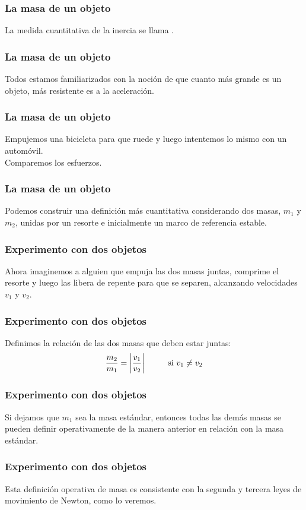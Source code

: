 \documentclass[12pt]{beamer}
\begin{document}
\begin{frame}
\frametitle{La masa de un objeto}
La medida cuantitativa de la inercia se llama .
\end{frame}
\begin{frame}
\frametitle{La masa de un objeto}
Todos estamos familiarizados con la noción de que cuanto más grande es un objeto, más resistente es a la aceleración.
\end{frame}
\begin{frame}
\frametitle{La masa de un objeto}
Empujemos una bicicleta para que ruede y luego intentemos lo mismo con un automóvil.
\\
\bigskip
\pause
Comparemos los esfuerzos.
\end{frame}
\begin{frame}
\frametitle{La masa de un objeto}
Podemos construir una definición más cuantitativa considerando dos masas, $m_{1}$ y $m_{2}$, unidas por un resorte e inicialmente un marco de referencia estable.
\end{frame}
\begin{frame}
\frametitle{Experimento con dos objetos}
Ahora imaginemos a alguien que empuja las dos masas juntas, comprime el resorte y luego las libera de repente para que se separen, alcanzando velocidades $v_{1}$ y $v_{2}$.
\end{frame}
\begin{frame}
\frametitle{Experimento con dos objetos}
Definimos la relación de las dos masas que deben estar juntas:
\pause
\begin{align}
\dfrac{m_{2}}{m_{1}} = \abs{\dfrac{v_{1}}{v_{2}}} \hspace{1cm} \text{si } v_{1} \neq v_{2}
\label{eq:ecuacion_02_01_01}
\end{align}
\end{frame}
\begin{frame}
\frametitle{Experimento con dos objetos}
Si dejamos que $m_{1}$ sea la masa estándar, entonces todas las demás masas se pueden definir operativamente de la manera anterior en relación con la masa estándar.
\end{frame}
\begin{frame}
\frametitle{Experimento con dos objetos}
Esta definición operativa de masa es consistente con la segunda y tercera leyes de movimiento de Newton, como lo veremos.
\end{frame}
\end{document}
